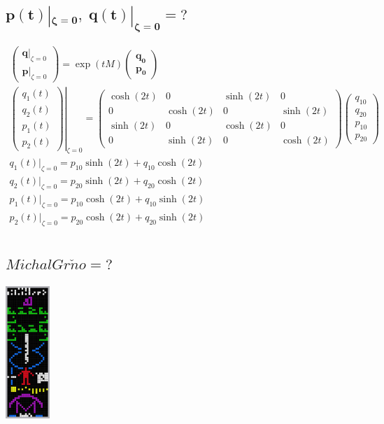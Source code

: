 \documentclass[10pt,a4paper]{article}
\newcommand{\mat}[1]{
    \begin{pmatrix}
        #1
    \end{pmatrix}
}
\begin{document}
\subsection{
    \texorpdfstring{
        $\pmb{ p(t)|_{\zeta=0}, \; q(t)|_{\zeta=0} = \mathit{?} }$
    }{
        p(t)|\{z=0\}, q(t)|\{z=0\} = ?
    }
}
\begin{gather*}
    \mat{
        \bm{q}|_{\zeta=0} \\ \bm{p}|_{\zeta=0}
    }
    =
    \exp(tM)
    \mat{
        \bm{q_0} \\ \bm{p_0}
    }
    \\[15pt]
    \left.
    \mat{
        q_1(t) \\ q_2(t) \\ p_1(t) \\ p_2(t)
    }
    \right|_{\zeta=0}
    =
    \mat{\cosh{\left(2 t \right)} & 0 & \sinh{\left(2 t \right)} & 0\\0 & \cosh{\left(2 t \right)} & 0 & \sinh{\left(2 t \right)}\\\sinh{\left(2 t \right)} & 0 & \cosh{\left(2 t \right)} & 0\\0 & \sinh{\left(2 t \right)} & 0 & \cosh{\left(2 t \right)}}
    \mat{
        q_{10} \\ q_{20} \\ p_{10} \\ p_{20}
    }
    \\[20pt]
    q_1(t)|_{\zeta=0} = p_{10} \sinh{\left(2 t \right)} + q_{10} \cosh{\left(2 t \right)}
    \\[5pt]
    q_2(t)|_{\zeta=0} = p_{20} \sinh{\left(2 t \right)} + q_{20} \cosh{\left(2 t \right)}
    \\[5pt]
    p_1(t)|_{\zeta=0} = p_{10} \cosh{\left(2 t \right)} + q_{10} \sinh{\left(2 t \right)}
    \\[5pt]
    p_2(t)|_{\zeta=0} = p_{20} \cosh{\left(2 t \right)} + q_{20} \sinh{\left(2 t \right)}
    \\[10pt]
\end{gather*}

\subsection{
    \texorpdfstring{
        $\pmb{ \mathit{Michal Gr\check{n}o} = \mathit{?} }$
    }{
        Michal Grňo = ?
    }
}
\centering
\includegraphics[height=5cm,keepaspectratio]{arecibo.png}
\end{document}
